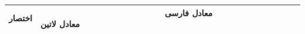 \renewcommand{\arraystretch}{1.4}
\begin{longtable}[c] {
r
p{0.9\dimexpr \textwidth-3\arrayrulewidth-4\tabcolsep\relax}
}
\textbf{\textcolor{BrickRed}{اختصار}} 
  &
~~~~
\textbf{\textcolor{BrickRed}{معادل فارسی}} 
~~~~~~~~~~~~~~~~~~~~~
~~~~~~~~~~~~~~~~~~~~~
~~~~~~~~~~~~~~~~~~~~~
\textbf{\textcolor{BrickRed}{معادل لاتین}}
\\ 
[0.2cm]
\endfirsthead



\end{longtable}
